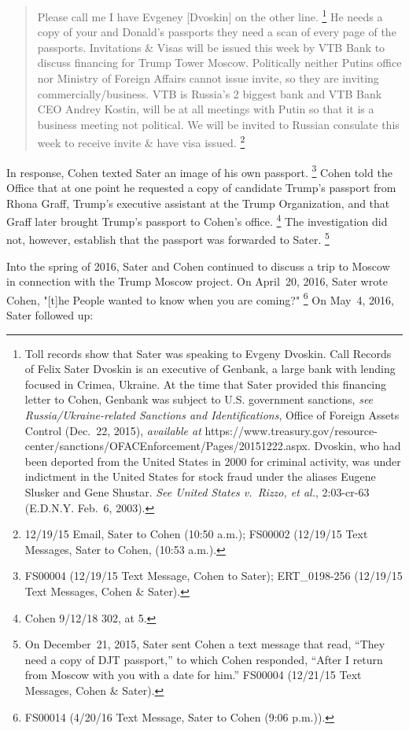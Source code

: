 \begin{quote}
Please call me I have Evgeney [Dvoskin] on the other line.%
\footnote{Toll records show that Sater was speaking to Evgeny Dvoskin.
Call Records of Felix Sater
Dvoskin is an executive of Genbank, a large bank with lending focused in Crimea, Ukraine.
At the time that Sater provided this financing letter to Cohen, Genbank was subject to U.S. government sanctions,
\textit{see Russia/Ukraine-related Sanctions and Identifications}, Office of Foreign Assets Control (Dec.~22, 2015), \textit{available at} https://www.treasury.gov/resource-center/sanctions/OFACEnforcement/Pages/20151222.aspx.
Dvoskin, who had been deported from the United States in 2000 for criminal activity, was under indictment in the United States for stock fraud under the aliases Eugene Slusker and Gene Shustar.
\textit{See United States v.\ Rizzo, et al.}, 2:03-cr-63 (E.D.N.Y. Feb.~6, 2003).}
He needs a copy of your and Donald's passports they need a scan of every page of the passports.
Invitations \& Visas will be issued this week by VTB Bank to discuss financing for Trump Tower Moscow. Politically neither Putins office nor Ministry of Foreign Affairs cannot issue invite, so they are inviting commercially/business.
VTB is Russia's 2 biggest bank and VTB Bank CEO Andrey Kostin, will be at all meetings with Putin so that it is a business meeting not political.
We will be invited to Russian consulate this week to receive invite \& have visa issued.%
\footnote{12/19/15 Email, Sater to Cohen (10:50 a.m.);
FS00002 (12/19/15 Text Messages, Sater to Cohen, (10:53 a.m.).}
\end{quote}

In response, Cohen texted Sater an image of his own passport.%
\footnote{FS00004 (12/19/15 Text Message, Cohen to Sater);
ERT\_0198-256 (12/19/15 Text Messages, Cohen \& Sater).}
Cohen told the Office that at one point he requested a copy of candidate Trump's passport from Rhona Graff, Trump's executive assistant at the Trump Organization, and that Graff later brought Trump's passport to Cohen's office.%
\footnote{Cohen 9/12/18 302, at 5.}
The investigation did not, however, establish that the passport was forwarded to Sater.%
\footnote{On December~21, 2015, Sater sent Cohen a text message that read, “They need a copy of DJT passport,” to which Cohen responded, “After I return from Moscow with you with a date for him.”
FS00004 (12/21/15 Text Messages, Cohen \& Sater).}

Into the spring of 2016, Sater and Cohen continued to discuss a trip to Moscow in connection with the Trump Moscow project.
On April~20, 2016, Sater wrote Cohen, "[t]he People wanted to know when you are coming?"%
\footnote{FS00014 (4/20/16 Text Message, Sater to Cohen (9:06 p.m.)).}
On May~4, 2016, Sater followed up:

